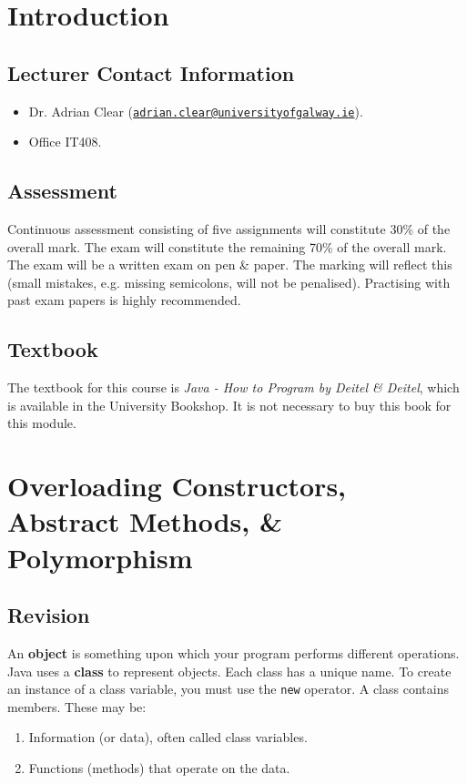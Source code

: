 \documentclass[a4paper,11pt]{article}
\begin{document}
\newpage
\tableofcontents
\newpage
\setcounter{page}{1}

\section{Introduction}
\subsection{Lecturer Contact Information}
\begin{itemize}
    \item Dr. Adrian Clear (\texttt{\href{mailto://adrian.clear@universityofgalway.ie}{adrian.clear@universityofgalway.ie}}).
    \item Office IT408.
\end{itemize}

\subsection{Assessment}
Continuous assessment consisting of five assignments will constitute 30\% of the overall mark. 
The exam will constitute the remaining 70\% of the overall mark.
The exam will be a written exam on pen \& paper. 
The marking will reflect this (small mistakes, e.g. missing semicolons, will not be penalised).
Practising with past exam papers is highly recommended.

\subsection{Textbook}
The textbook for this course is \emph{Java - How to Program by Deitel \& Deitel}, which is available in the University 
Bookshop.
It is not necessary to buy this book for this module.

\section{Overloading Constructors, Abstract Methods, \& Polymorphism}
\subsection{Revision}
An \textbf{object} is something upon which your program performs different operations. 
Java uses a \textbf{class} to represent objects. 
Each class has a unique name.
To create an instance of a class variable, you must use the \verb|new| operator.
A class contains members.
These may be:
\begin{enumerate}
    \item Information (or data), often called class variables. 
    \item Functions (methods) that operate on the data.
\end{enumerate}
\end{document}
